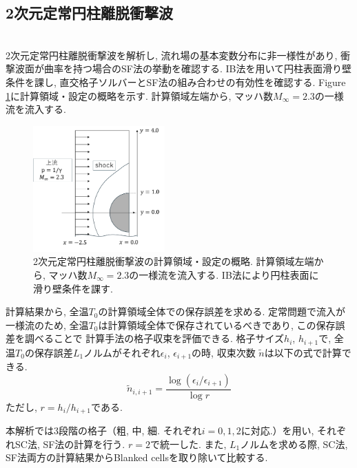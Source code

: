 \documentclass[a4j]{jarticle}
\begin{document}
\subsection{2次元定常円柱離脱衝撃波}\label{subsec:2Dcirc}
\mbox{}\\[-3.0ex]

2次元定常円柱離脱衝撃波を解析し, 流れ場の基本変数分布に非一様性があり, 衝撃波面が曲率を持つ場合のSF法の挙動を確認する.
IB法を用いて円柱表面滑り壁条件を課し, 直交格子ソルバーとSF法の組み合わせの有効性を確認する.
Figure \ref{fig:2Dcolumnsitu}に計算領域・設定の概略を示す.
計算領域左端から, マッハ数$M_\infty=2.3$の一様流を流入する.
\begin{figure}[h]
    \begin{center}
        \includegraphics[width=0.45\textwidth]{2Dcolumnsitu.pdf}
    \end{center}
    \caption{2次元定常円柱離脱衝撃波の計算領域・設定の概略.
    計算領域左端から, マッハ数$M_\infty=2.3$の一様流を流入する.
    IB法により円柱表面に滑り壁条件を課す.}
    \label{fig:2Dcolumnsitu}
\end{figure}

計算結果から, 全温$T_0$の計算領域全体での保存誤差を求める.
定常問題で流入が一様流のため, 全温$T_0$は計算領域全体で保存されているべきであり, この保存誤差を調べることで
計算手法の格子収束を評価できる. 
格子サイズ$h_i$, $h_{i+1}$で, 全温$T_0$の保存誤差$L_1$ノルムがそれぞれ$\epsilon_i$, $\epsilon_{i+1}$の時,
収束次数 $\tilde{n}$は以下の式で計算できる.
\begin{equation}
  \tilde{n}_{i,i+1} = \frac{\log (\epsilon_i/\epsilon_{i+1})}{\log r}
    \label{eq:order_of_conv}
\end{equation}
ただし, $r = h_i/h_{i+1}$である.

本解析では3段階の格子（粗, 中, 細. それぞれ$i=0,1,2$に対応.）を用い, それぞれSC法, SF法の計算を行う.
$r=2$で統一した.
また, $L_1$ノルムを求める際, SC法, SF法両方の計算結果からBlanked cellsを取り除いて比較する.
\end{document}
